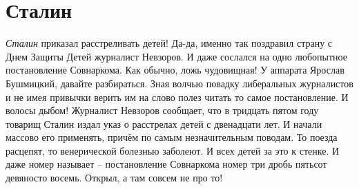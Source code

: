  
 
 
 
 
\chapter{Сталин}

\emph{Сталин} приказал расстреливать детей! Да-да, именно так поздравил страну с Днем
Защиты Детей журналист Невзоров. И даже сослался на одно любопытное
постановление Совнаркома. Как обычно, ложь чудовищная!  У аппарата Ярослав
Бушмицкий, давайте разбираться. Зная волчью повадку либеральных журналистов и
не имея привычки верить им на слово полез читать то самое постановление. И
волосы дыбом!  Журналист Невзоров сообщает, что в тридцать пятом году товарищ
Сталин издал указ о расстрелах детей с двенадцати лет. И начали массово его
применять, причём по самым незначительным поводам. То поезда расцепят, то
венерической болезнью заболеют. И всех детей за это к стенке. И даже номер
называет – постановление Совнаркома номер три дробь пятьсот девяносто восемь.
Открыл, а там совсем не про то!

